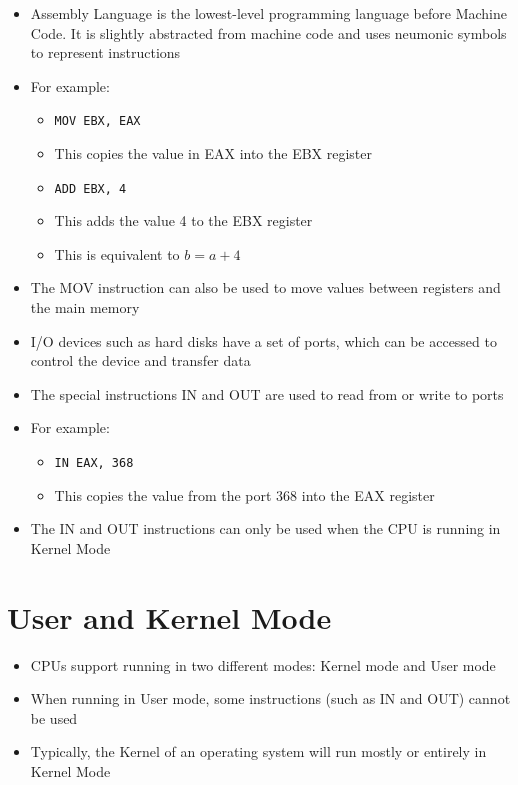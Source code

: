 \begin{itemize}
  \item Assembly Language is the lowest-level programming language before Machine Code. It is slightly abstracted from machine code and uses neumonic symbols to represent instructions
  \item For example:
  \begin{itemize}
    \item \begin{verbatim}MOV EBX, EAX\end{verbatim}
    \item This copies the value in EAX into the EBX register
    \item \begin{verbatim}ADD EBX, 4\end{verbatim}
    \item This adds the value 4 to the EBX register
    \item This is equivalent to $b = a + 4$
  \end{itemize}
  \item The MOV instruction can also be used to move values between registers and the main memory
  \item I/O devices such as hard disks have a set of ports, which can be accessed to control the device and transfer data
  \item The special instructions IN and OUT are used to read from or write to ports
  \item For example:
  \begin{itemize}
    \item \begin{verbatim}IN EAX, 368\end{verbatim}
    \item This copies the value from the port 368 into the EAX register
  \end{itemize}
  \item The IN and OUT instructions can only be used when the CPU is running in Kernel Mode
\end{itemize}

\section*{User and Kernel Mode}

\begin{itemize}
  \item CPUs support running in two different modes: Kernel mode and User mode
  \item When running in User mode, some instructions (such as IN and OUT) cannot be used
  \item Typically, the Kernel of an operating system will run mostly or entirely in Kernel Mode
\end{itemize}

